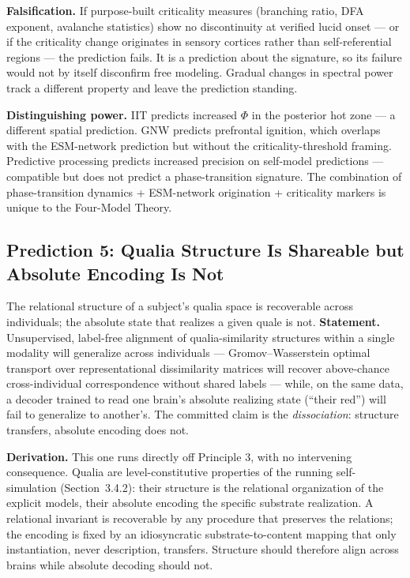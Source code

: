 \documentclass[12pt]{article}
\begin{document}
\textbf{Falsification.} If purpose-built criticality measures (branching ratio, DFA exponent, avalanche statistics) show no discontinuity at verified lucid onset --- or if the criticality change originates in sensory cortices rather than self-referential regions --- the prediction fails. It is a prediction about the signature, so its failure would not by itself disconfirm free modeling. Gradual changes in spectral power track a different property and leave the prediction standing.

\textbf{Distinguishing power.} IIT predicts increased $\Phi$ in the posterior hot zone --- a different spatial prediction. GNW predicts prefrontal ignition, which overlaps with the ESM-network prediction but without the criticality-threshold framing. Predictive processing predicts increased precision on self-model predictions --- compatible but does not predict a phase-transition signature. The combination of phase-transition dynamics + ESM-network origination + criticality markers is unique to the Four-Model Theory.


\subsection{Prediction 5: Qualia Structure Is Shareable but Absolute Encoding Is Not}

The relational structure of a subject's qualia space is recoverable across individuals; the absolute state that realizes a given quale is not. \textbf{Statement.} Unsupervised, label-free alignment of qualia-similarity structures within a single modality will generalize across individuals --- Gromov--Wasserstein optimal transport over representational dissimilarity matrices \citep{Kriegeskorte2008} will recover above-chance cross-individual correspondence without shared labels --- while, on the same data, a decoder trained to read one brain's absolute realizing state (``their red'') will fail to generalize to another's. The committed claim is the \emph{dissociation}: structure transfers, absolute encoding does not.

\textbf{Derivation.} This one runs directly off Principle 3, with no intervening consequence. Qualia are level-constitutive properties of the running self-simulation (Section~3.4.2): their structure is the relational organization of the explicit models, their absolute encoding the specific substrate realization. A relational invariant is recoverable by any procedure that preserves the relations; the encoding is fixed by an idiosyncratic substrate-to-content mapping that only instantiation, never description, transfers. Structure should therefore align across brains while absolute decoding should not.
\end{document}
